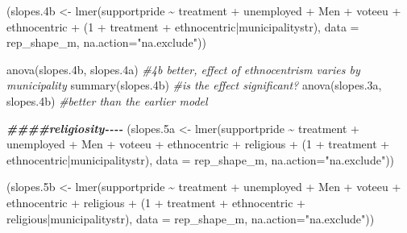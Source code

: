 \documentclass[
]{article}
\newenvironment{Shaded}{\begin{snugshade}}{\end{snugshade}}
\newcommand{\AttributeTok}[1]{\textcolor[rgb]{0.77,0.63,0.00}{#1}}
\newcommand{\CommentTok}[1]{\textcolor[rgb]{0.56,0.35,0.01}{\textit{#1}}}
\newcommand{\DecValTok}[1]{\textcolor[rgb]{0.00,0.00,0.81}{#1}}
\newcommand{\DocumentationTok}[1]{\textcolor[rgb]{0.56,0.35,0.01}{\textbf{\textit{#1}}}}
\newcommand{\FloatTok}[1]{\textcolor[rgb]{0.00,0.00,0.81}{#1}}
\newcommand{\FunctionTok}[1]{\textcolor[rgb]{0.00,0.00,0.00}{#1}}
\newcommand{\NormalTok}[1]{#1}
\newcommand{\OtherTok}[1]{\textcolor[rgb]{0.56,0.35,0.01}{#1}}
\newcommand{\SpecialCharTok}[1]{\textcolor[rgb]{0.00,0.00,0.00}{#1}}
\newcommand{\StringTok}[1]{\textcolor[rgb]{0.31,0.60,0.02}{#1}}
\begin{document}
\begin{Shaded}
\begin{Highlighting}[]
\NormalTok{(slopes}\FloatTok{.4}\NormalTok{b }\OtherTok{\textless{}{-}} \FunctionTok{lmer}\NormalTok{(supportpride }\SpecialCharTok{\textasciitilde{}}\NormalTok{ treatment }\SpecialCharTok{+}\NormalTok{ unemployed }\SpecialCharTok{+}\NormalTok{ Men }\SpecialCharTok{+}\NormalTok{ voteeu }\SpecialCharTok{+}\NormalTok{ ethnocentric }\SpecialCharTok{+}\NormalTok{ (}\DecValTok{1} \SpecialCharTok{+}\NormalTok{ treatment }\SpecialCharTok{+}\NormalTok{ ethnocentric}\SpecialCharTok{|}\NormalTok{municipalitystr),}
                   \AttributeTok{data =}\NormalTok{ rep\_shape\_m, }\AttributeTok{na.action=}\StringTok{"na.exclude"}\NormalTok{))}

\FunctionTok{anova}\NormalTok{(slopes}\FloatTok{.4}\NormalTok{b, slopes}\FloatTok{.4}\NormalTok{a) }\CommentTok{\#4b better, effect of ethnocentrism varies by municipality}
\FunctionTok{summary}\NormalTok{(slopes}\FloatTok{.4}\NormalTok{b) }\CommentTok{\#is the effect significant?}
\FunctionTok{anova}\NormalTok{(slopes}\FloatTok{.3}\NormalTok{a, slopes}\FloatTok{.4}\NormalTok{b) }\CommentTok{\#better than the earlier model}

\DocumentationTok{\#\#\#\#religiosity{-}{-}{-}{-}}
\NormalTok{(slopes}\FloatTok{.5}\NormalTok{a }\OtherTok{\textless{}{-}} \FunctionTok{lmer}\NormalTok{(supportpride }\SpecialCharTok{\textasciitilde{}}\NormalTok{ treatment }\SpecialCharTok{+}\NormalTok{ unemployed }\SpecialCharTok{+}\NormalTok{ Men }\SpecialCharTok{+}\NormalTok{ voteeu }\SpecialCharTok{+}\NormalTok{ ethnocentric }\SpecialCharTok{+}\NormalTok{ religious }\SpecialCharTok{+}\NormalTok{ (}\DecValTok{1} \SpecialCharTok{+}\NormalTok{ treatment }\SpecialCharTok{+}\NormalTok{ ethnocentric}\SpecialCharTok{|}\NormalTok{municipalitystr),}
                   \AttributeTok{data =}\NormalTok{ rep\_shape\_m, }\AttributeTok{na.action=}\StringTok{"na.exclude"}\NormalTok{))}

\NormalTok{(slopes}\FloatTok{.5}\NormalTok{b }\OtherTok{\textless{}{-}} \FunctionTok{lmer}\NormalTok{(supportpride }\SpecialCharTok{\textasciitilde{}}\NormalTok{ treatment }\SpecialCharTok{+}\NormalTok{ unemployed }\SpecialCharTok{+}\NormalTok{ Men }\SpecialCharTok{+}\NormalTok{ voteeu }\SpecialCharTok{+}\NormalTok{ ethnocentric }\SpecialCharTok{+}\NormalTok{ religious }\SpecialCharTok{+}\NormalTok{ (}\DecValTok{1} \SpecialCharTok{+}\NormalTok{ treatment }\SpecialCharTok{+}\NormalTok{ ethnocentric }\SpecialCharTok{+}\NormalTok{ religious}\SpecialCharTok{|}\NormalTok{municipalitystr),}
                   \AttributeTok{data =}\NormalTok{ rep\_shape\_m, }\AttributeTok{na.action=}\StringTok{"na.exclude"}\NormalTok{))}


\end{Highlighting}
\end{Shaded}
\end{document}

